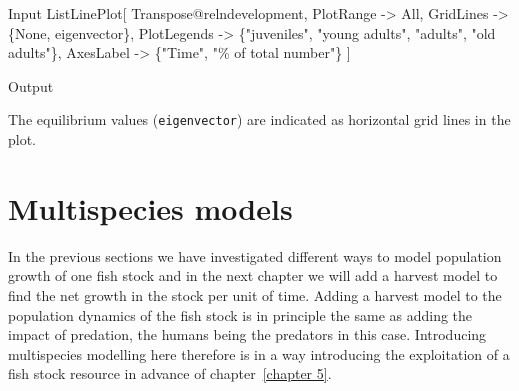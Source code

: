 \documentclass[11pt,fleqn]{book} %
\begin{document}
\begin{theorem}
\begin{mmaCell}{Input}
  ListLinePlot[
    Transpose@relndevelopment,
    PlotRange   -> All, 
    GridLines   -> \{None, eigenvector\}, 
    PlotLegends -> 
      \{"juveniles", "young adults", "adults", "old adults"\},
    AxesLabel   -> \{"Time", "\% of total number"\}
  ]
\end{mmaCell}
\begin{mmaCell}[moregraphics={moreig={scale=.9}}]{Output}
\end{mmaCell}
The equilibrium values (\texttt{eigenvector}) are indicated as horizontal grid lines in the plot.
\label{code:leslie}
\end{theorem}

\begin{figure}[!htb]
\end{figure}

\section{Multispecies models}\label{section:multispecies}
In the previous sections we have investigated different ways to model population growth of one fish stock and in the next chapter we will add a harvest model to find the net growth in the stock per unit of time. Adding a harvest model to the population dynamics of the fish stock is in principle the same as adding the impact of predation, the humans being the predators in this case. Introducing multispecies modelling here therefore is in a way introducing the exploitation of a fish stock resource in advance of chapter~\ref{chapter 5}.
\end{document}
